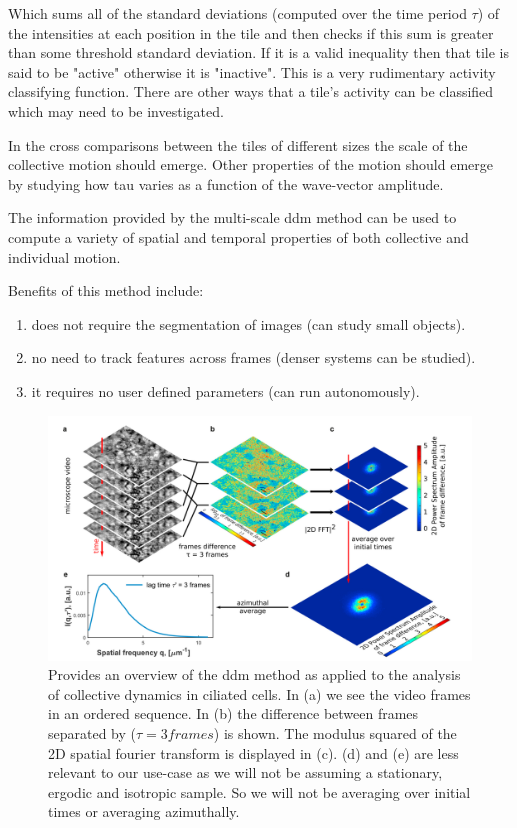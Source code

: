 \documentclass[11pt]{article}
\begin{document}
Which sums all of the standard deviations (computed over the time period $\tau$) of the intensities at each position in the tile and then checks if this sum is greater than some threshold standard deviation.
If it is a valid inequality then that tile is said to be "active" otherwise it is "inactive".\cite{ddm2}
This is a very rudimentary activity classifying function.
There are other ways that a tile's activity can be classified which may need to be investigated.

In the cross comparisons between the tiles of different sizes the scale of the collective motion should emerge.\cite{ddm1}
Other properties of the motion should emerge by studying how tau varies as a function of the wave-vector amplitude.\cite{ddm1}

The information provided by the multi-scale ddm method can be used to compute a variety of spatial and temporal properties of both collective and individual motion.\cite{ddm1}\cite{ddm2}

Benefits of this method include:
\begin {enumerate}
 \item does not require the segmentation of images (can study small objects).
 \item no need to track features across frames (denser systems can be studied).
 \item it requires no user defined parameters (can run autonomously).
\end{enumerate}\cite{ddm1}

\begin{figure}
\includegraphics{ddmpic.png}
\caption{Provides an overview of the ddm method as applied to the analysis of collective dynamics in ciliated cells.
In (a) we see the video frames in an ordered sequence.
In (b) the difference between frames separated by ($\tau=3 frames$) is shown.
The modulus squared of the 2D spatial fourier transform is displayed in (c).
(d) and (e) are less relevant to our use-case as we will not be assuming a stationary, ergodic and isotropic sample.
So we will not be averaging over initial times or averaging azimuthally.\cite{ddm2}}
\end{figure}
\end{document}
